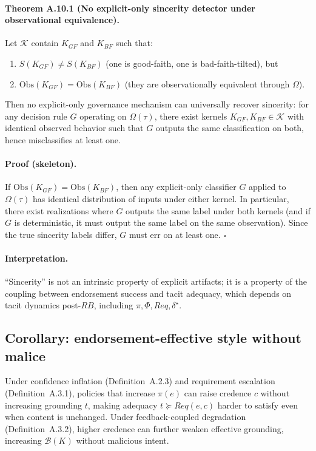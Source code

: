 \documentclass[preprints,article,submit,pdftex,moreauthors,accept]{Definitions/mdpi}
\begin{document}
\paragraph{Theorem A.10.1 (No explicit-only sincerity detector under observational equivalence).}
Let \(\mathcal{K}\) contain \(K_{GF}\) and \(K_{BF}\) such that:
\begin{enumerate}
  \item \(S(K_{GF})\ne S(K_{BF})\) (one is good-faith, one is bad-faith-tilted), but
  \item \(\mathrm{Obs}(K_{GF})=\mathrm{Obs}(K_{BF})\) (they are observationally equivalent through \(\Omega\)).
\end{enumerate}
Then no explicit-only governance mechanism can universally recover sincerity: for any decision rule \(G\) operating on \(\Omega(\tau)\), there exist kernels \(K_{GF},K_{BF}\in\mathcal{K}\) with identical observed behavior such that \(G\) outputs the same classification on both, hence misclassifies at least one.

\paragraph{Proof (skeleton).}
If \(\mathrm{Obs}(K_{GF})=\mathrm{Obs}(K_{BF})\), then any explicit-only classifier \(G\) applied to \(\Omega(\tau)\) has identical distribution of inputs under either kernel. In particular, there exist realizations where \(G\) outputs the same label under both kernels (and if \(G\) is deterministic, it must output the same label on the same observation). Since the true sincerity labels differ, \(G\) must err on at least one. \(\square\)

\paragraph{Interpretation.}
``Sincerity'' is not an intrinsic property of explicit artifacts; it is a property of the coupling between endorsement success and tacit adequacy, which depends on tacit dynamics post-\(RB\), including \(\pi,\Phi,Req,\delta^\star\).

\subsection{Corollary: endorsement-effective style without malice}
Under confidence inflation (Definition~A.2.3) and requirement escalation (Definition~A.3.1), policies that increase \(\pi(e)\) can raise credence \(c\) without increasing grounding \(t\), making adequacy \(t\succeq Req(e,c)\) harder to satisfy even when content is unchanged. Under feedback-coupled degradation (Definition~A.3.2), higher credence can further weaken effective grounding, increasing \(\mathcal{B}(K)\) without malicious intent.
\end{document}
